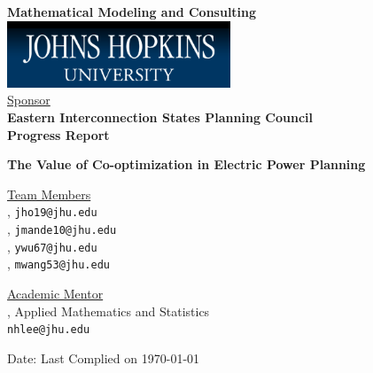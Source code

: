 \documentclass[oneside,12pt]{report}
\begin{document}
\def\thefootnote{\fnsymbol{footnote}}

\thispagestyle{empty}

\def\shiftdowna{0.32in}  %
\def\shiftdownb{0.22in}  %


\begin{center}
\textbf{{\large Mathematical Modeling and Consulting }}\\

\vspace \shiftdowna
\includegraphics[width=0.5\textwidth]{jhu.png}\\

\vspace \shiftdowna
\underline {Sponsor}\\ 
\vspace{5pt}
\textbf{\large Eastern Interconnection States Planning Council} \\
\vspace\shiftdowna
\textbf{{Progress Report}}

\vspace \shiftdowna
\textbf{{\Large The Value of Co-optimization in Electric Power Planning}}

\vspace{0.35in}
\underline {Team Members}\\
\vspace{5pt}
, \texttt{jho19@jhu.edu}\\
\vspace{5pt}
, \texttt{jmande10@jhu.edu}\\
\vspace{5pt}
, \texttt{ywu67@jhu.edu}\\
\vspace{5pt}
, \texttt{mwang53@jhu.edu}\\
\vspace{10pt}

\vspace \shiftdownb
\underline {Academic Mentor} \\
\vspace{5pt}
, Applied Mathematics and Statistics\\
\texttt{nhlee@jhu.edu}


\vspace \shiftdowna
Date: Last Complied on \today

\end{center}
\end{document}
